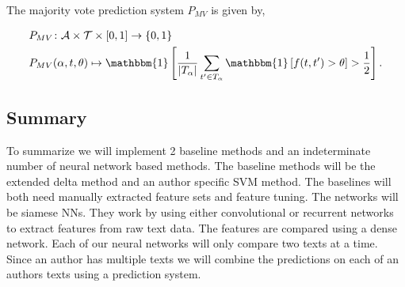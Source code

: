 \begin{definition}
    \label{def:majority_vote_prediction_system}

    The majority vote prediction system $P_{MV}$ is given by,

    \begin{align}
        &P_{MV} \colon \mathcal{A} \times \mathcal{T} \times [0, 1] \rightarrow
            \{0, 1\} \\
        &P_{MV}(\alpha, t, \theta) \mapsto \mathbbm{1}\left[
                \frac{1}{|T_\alpha|} \sum_{t' \in T_\alpha} \mathbbm{1}\left[
                    f(t, t') > \theta
                \right] > \frac{1}{2}
            \right].
    \end{align}

\end{definition}


\subsection{Summary}

To summarize we will implement 2 baseline methods and an indeterminate number of
neural network based methods. The baseline methods will be the extended delta
method and an author specific \gls{SVM} method. The baselines will both need
manually extracted feature sets and feature tuning. The networks will be siamese
\glspl{NN}. They work by using either convolutional or recurrent networks to
extract features from raw text data. The features are compared using a dense
network. Each of our neural networks will only compare two texts at a time.
Since an author has multiple texts we will combine the predictions on each of an
authors texts using a prediction system.

